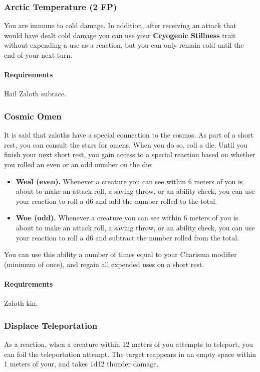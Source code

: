     \subsubsection{Arctic Temperature (2 FP)} \label{feat::arctictemperature}
        You are immune to cold damage.
        In addition, after receiving an attack that would have dealt cold damage you can use your \textbf{Cryogenic Stillness} trait without expending a use as a reaction, but you can only remain cold until the end of your next turn.
        \paragraph{Requirements} Hail Zaloth subrace.
    \subsubsection{Cosmic Omen} \label{feat::cosmicomen}
        It is said that zaloths have a special connection to the cosmos.
        As part of a short rest, you can consult the stars for omens.
        When you do so, roll a die.
        Until you finish your next short rest, you gain access to a special reaction based on whether you rolled an even or an odd number on the die:
        \begin{itemize}
            \item \textbf{Weal (even).} Whenever a creature you can see within 6 meters of you is about to make an attack roll, a saving throw, or an ability check, you can use your reaction to roll a d6 and add the number rolled to the total.
            \item \textbf{Woe (odd).} Whenever a creature you can see within 6 meters of you is about to make an attack roll, a saving throw, or an ability check, you can use your reaction to roll a d6 and subtract the number rolled from the total.
        \end{itemize}
        You can use this ability a number of times equal to your Charisma modifier (minimum of once), and regain all expended uses on a short rest.
        \paragraph{Requirements} Zaloth kin.
    \subsubsection{Displace Teleportation} \label{feat::displaceteleportation}
        As a reaction, when a creature within 12 meters of you attempts to teleport, you can foil the teleportation attempt.
        The target reappears in an empty space within 1 meters of your, and takes 1d12 thunder damage.
